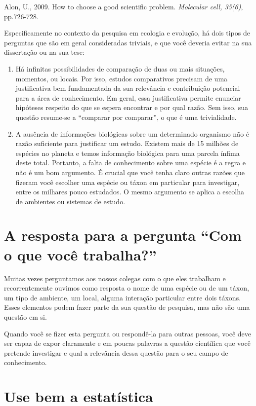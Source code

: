 Alon, U., 2009. How to choose a good scientific problem. \emph{Molecular cell, 35(6)}, pp.726-728.


Especificamente no contexto da pesquisa em ecologia e evolução, há
dois tipos de perguntas que são em geral consideradas triviais, e que
você deveria evitar na sua dissertação ou na sua tese:

\begin{enumerate}
\item Há infinitas possibilidades de comparação de duas ou mais
  situações, momentos, ou locais. Por isso, estudos comparativos
  precisam de uma justificativa bem fundamentada da sua relevância e
  contribuição potencial para a área de conhecimento. Em geral, essa
  justificativa permite enunciar hipóteses respeito do que se espera
  encontrar e por qual razão. Sem isso, sua questão resume-se a
  ``comparar por comparar'', o que é uma trivialidade.
\item A ausência de informações biológicas sobre um determinado
  organismo não é razão suficiente para justificar um estudo. Existem
  mais de 15 milhões de espécies no planeta e temos informação
  biológica para uma parcela ínfima deste total. Portanto, a falta de
  conhecimento sobre uma espécie é a regra e não é um bom argumento. É
  crucial que você tenha claro outras razões que fizeram você escolher
  uma espécie ou táxon em particular para investigar, entre os
  milhares pouco estudados. O mesmo argumento se aplica a escolha de
  ambientes ou sistemas de estudo.
\end{enumerate}

\section{A resposta para a pergunta “Com o que você trabalha?”}

Muitas vezes perguntamos aos nossos colegas com o que eles trabalham e
recorrentemente ouvimos como resposta o nome de uma espécie ou de um
táxon, um tipo de ambiente, um local, alguma interação particular
entre dois táxons. Esses elementos podem fazer parte da sua questão de
pesquisa, mas não são uma questão em si.

Quando você se fizer esta pergunta ou respondê-la para outras pessoas,
você deve ser capaz de expor claramente e em poucas palavras a questão
científica que você pretende investigar e qual a relevância dessa
questão para o seu campo de conhecimento.

\section{Use bem a estatística}

